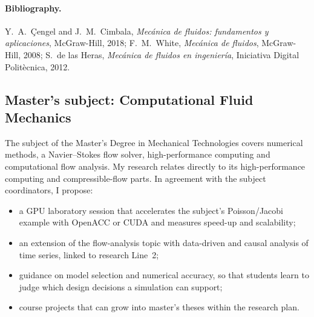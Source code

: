 \documentclass[11pt]{article}
\begin{document}
\paragraph{Bibliography.} Y.\ A.\ \c{C}engel and J.\ M.\ Cimbala, \emph{Mec\'anica de
fluidos: fundamentos y aplicaciones}, McGraw-Hill, 2018; F.\ M.\ White, \emph{Mec\'anica de
fluidos}, McGraw-Hill, 2008; S.\ de las Heras, \emph{Mec\'anica de fluidos en
ingenier\'ia}, Iniciativa Digital Polit\`ecnica, 2012.

\subsection{Master's subject: Computational Fluid Mechanics}\label{sec:cfm}
The subject of the Master's Degree in Mechanical Technologies covers numerical methods, a
Navier--Stokes flow solver, high-performance computing and computational flow analysis.
My research relates directly to its high-performance computing and compressible-flow
parts. In agreement with the subject coordinators, I propose:
\begin{itemize}
  \item a GPU laboratory session that accelerates the subject's Poisson/Jacobi example
  with OpenACC or CUDA and measures speed-up and scalability;
  \item an extension of the flow-analysis topic with data-driven and causal analysis of
  time series, linked to research Line~2;
  \item guidance on model selection and numerical accuracy, so that students learn to judge
  which design decisions a simulation can support;
  \item course projects that can grow into master's theses within the research plan.
\end{itemize}
\end{document}
